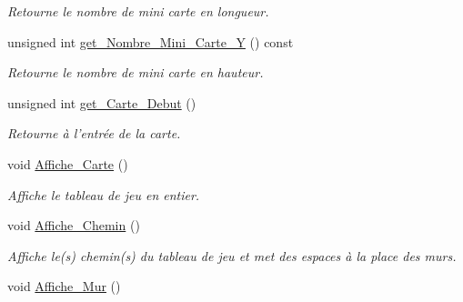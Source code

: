 \begin{DoxyCompactItemize}
\begin{DoxyCompactList}\small\item\em Retourne le nombre de mini carte en longueur. \end{DoxyCompactList}\item 
\hypertarget{classCarte_a2957564cf7bb7f3c89954451a07fc318}{unsigned int \hyperlink{classCarte_a2957564cf7bb7f3c89954451a07fc318}{get\+\_\+\+Nombre\+\_\+\+Mini\+\_\+\+Carte\+\_\+\+Y} () const }\label{classCarte_a2957564cf7bb7f3c89954451a07fc318}

\begin{DoxyCompactList}\small\item\em Retourne le nombre de mini carte en hauteur. \end{DoxyCompactList}\item 
\hypertarget{classCarte_a5fd5f24240d1b396d233c8f8399bd7c1}{unsigned int \hyperlink{classCarte_a5fd5f24240d1b396d233c8f8399bd7c1}{get\+\_\+\+Carte\+\_\+\+Debut} ()}\label{classCarte_a5fd5f24240d1b396d233c8f8399bd7c1}

\begin{DoxyCompactList}\small\item\em Retourne à l'entrée de la carte. \end{DoxyCompactList}\item 
\hypertarget{classCarte_af77de2066023dbca81ad829e991ea62b}{void \hyperlink{classCarte_af77de2066023dbca81ad829e991ea62b}{Affiche\+\_\+\+Carte} ()}\label{classCarte_af77de2066023dbca81ad829e991ea62b}

\begin{DoxyCompactList}\small\item\em Affiche le tableau de jeu en entier. \end{DoxyCompactList}\item 
\hypertarget{classCarte_a25abec889945b8d18025a6d4f6f12fe4}{void \hyperlink{classCarte_a25abec889945b8d18025a6d4f6f12fe4}{Affiche\+\_\+\+Chemin} ()}\label{classCarte_a25abec889945b8d18025a6d4f6f12fe4}

\begin{DoxyCompactList}\small\item\em Affiche le(s) chemin(s) du tableau de jeu et met des espaces à la place des murs. \end{DoxyCompactList}\item 
\hypertarget{classCarte_a3736d5571557c8eeeb1ad33276133aef}{void \hyperlink{classCarte_a3736d5571557c8eeeb1ad33276133aef}{Affiche\+\_\+\+Mur} ()}\label{classCarte_a3736d5571557c8eeeb1ad33276133aef}


\end{DoxyCompactItemize}
